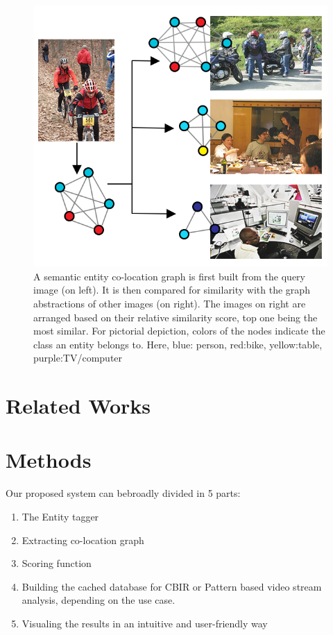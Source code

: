 \documentclass[conference]{IEEEtran}
\begin{document}
\begin{figure}
  \includegraphics[width=\linewidth]{Co-Loc-Diagram}
  \caption{A semantic entity co-location graph is first built from the query image (on left). It is then compared for similarity with the graph abstractions of other images (on right). The images on right are arranged based on their relative similarity score, top one being the most similar. For pictorial depiction, colors of the nodes indicate the class an entity belongs to. Here, blue: person, red:bike, yellow:table, purple:TV/computer   }
  \label{fig:C0-Loc-Diagram}
\end{figure}

\section{Related Works}


\section{Methods}
Our proposed system can bebroadly divided in 5 parts: 
    \begin{enumerate}
            \item The Entity tagger
            \item Extracting co-location graph
            \item Scoring function
            \item Building the cached database for CBIR or Pattern based video stream analysis, depending on the use case. 
            \item Visualing the results in an intuitive and user-friendly way
    \end{enumerate}
    
\end{document}
